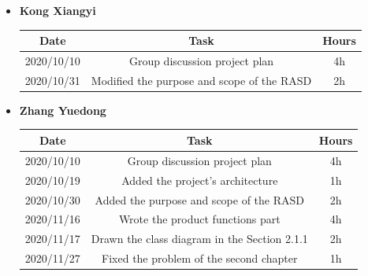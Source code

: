 \documentclass[a4paper,12pt]{book}
\begin{document}
\begin{itemize}
	\item \textbf{Kong Xiangyi}
	\begin{center}
		\begin{tabular}{ |c|c|c| } 
			\hline
			Date & Task & Hours \\
			\hline
			\hline
			2020/10/10 & Group discussion project plan & 4h \\ 
			\hline
			2020/10/31 & Modified the purpose and scope of the RASD & 2h \\ 
			\hline
		\end{tabular}
	\end{center}
	\item \textbf{Zhang Yuedong}
	\begin{center}
		\begin{tabular}{ |c|c|c| } 
			\hline
			Date & Task & Hours \\
			\hline
			\hline
			2020/10/10 & Group discussion project plan & 4h \\ 
			\hline
			2020/10/19 & Added the project's architecture & 1h \\ 
			\hline
			2020/10/30 & Added the purpose and scope of the RASD & 2h \\ 
			\hline
			2020/11/16 & Wrote the product functions part & 4h \\ 
			\hline
			2020/11/17 & Drawn the class diagram in the Section 2.1.1  & 2h \\ 
			\hline
			2020/11/27 & Fixed the problem of the second chapter & 1h \\
			\hline
		\end{tabular}
	\end{center}
\end{itemize}


\backmatter
\end{document}
